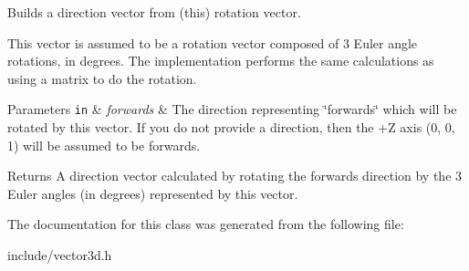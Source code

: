 Builds a direction vector from (this) rotation vector. 

This vector is assumed to be a rotation vector composed of 3 Euler angle rotations, in degrees. The implementation performs the same calculations as using a matrix to do the rotation.


\begin{DoxyParams}[1]{Parameters}
\mbox{\tt in}  & {\em forwards} & The direction representing \char`\"{}forwards\char`\"{} which will be rotated by this vector. If you do not provide a direction, then the +Z axis (0, 0, 1) will be assumed to be forwards. \\
\hline
\end{DoxyParams}
\begin{DoxyReturn}{Returns}
A direction vector calculated by rotating the forwards direction by the 3 Euler angles (in degrees) represented by this vector. 
\end{DoxyReturn}


The documentation for this class was generated from the following file\+:\begin{DoxyCompactItemize}
\item 
include/vector3d.\+h\end{DoxyCompactItemize}
